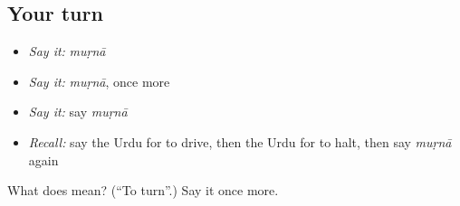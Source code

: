 \subsection*{Your turn}
\begin{itemize}
\raggedright
  \item \emph{Say it:} \emph{muṛnā}
  \item \emph{Say it:} \emph{muṛnā}, once more
  \item \emph{Say it:} say \emph{muṛnā}
  \item \emph{Recall:} say the Urdu for to drive, then the Urdu for to halt, then say \emph{muṛnā} again
\end{itemize}

\begin{tcolorbox}[breakable,colback=teal!4,colframe=teal!35!black,title={Before you move on}]
What does  mean? (\textquotedblleft{}To turn\textquotedblright{}.) Say it once more.
\end{tcolorbox}
